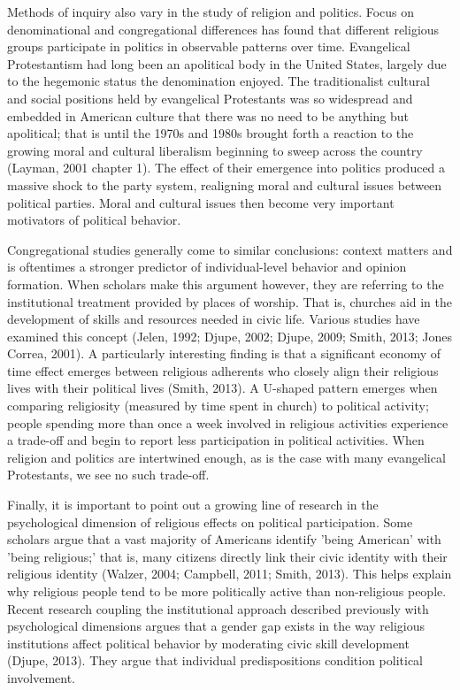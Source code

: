 \documentclass{article}
\begin{document}
Methods of inquiry also vary in the study of religion and politics.  Focus on denominational and congregational differences has found that different religious groups participate in politics in observable patterns over time.  Evangelical Protestantism had long been an apolitical body in the United States, largely due to the hegemonic status the denomination enjoyed.  The traditionalist cultural and social positions held by evangelical Protestants was so widespread and embedded in American culture that there was no need to be anything but apolitical; that is until the 1970s and 1980s brought forth a reaction to the growing moral and cultural liberalism beginning to sweep across the country (Layman, 2001 chapter 1).  The effect of their emergence into politics produced a massive shock to the party system, realigning moral and cultural issues between political parties.  Moral and cultural issues then become very important motivators of political behavior.

Congregational studies generally come to similar conclusions: context matters and is oftentimes a stronger predictor of individual-level behavior and opinion formation.  When scholars make this argument however, they are referring to the institutional treatment provided by places of worship.  That is, churches aid in the development of skills and resources needed in civic life.  Various studies have examined this concept (Jelen, 1992; Djupe, 2002; Djupe, 2009; Smith, 2013; Jones Correa, 2001).  A particularly interesting finding is that a significant economy of time effect emerges between religious adherents who closely align their religious lives with their political lives (Smith, 2013).  A U-shaped pattern emerges when comparing religiosity (measured by time spent in church) to political activity; people spending more than once a week involved in religious activities experience a trade-off and begin to report less participation in political activities.  When religion and politics are intertwined enough, as is the case with many evangelical Protestants, we see no such trade-off.

Finally, it is important to point out a growing line of research in the psychological dimension of religious effects on political participation.  Some scholars argue that a vast majority of Americans identify 'being American' with 'being religious;' that is, many citizens directly link their civic identity with their religious identity (Walzer, 2004; Campbell, 2011; Smith, 2013).  This helps explain why religious people tend to be more politically active than non-religious people.  Recent research coupling the institutional approach described previously with psychological dimensions argues that a gender gap exists in the way religious institutions affect political behavior by moderating civic skill development (Djupe, 2013).  They argue that individual predispositions condition political involvement.
\end{document}
